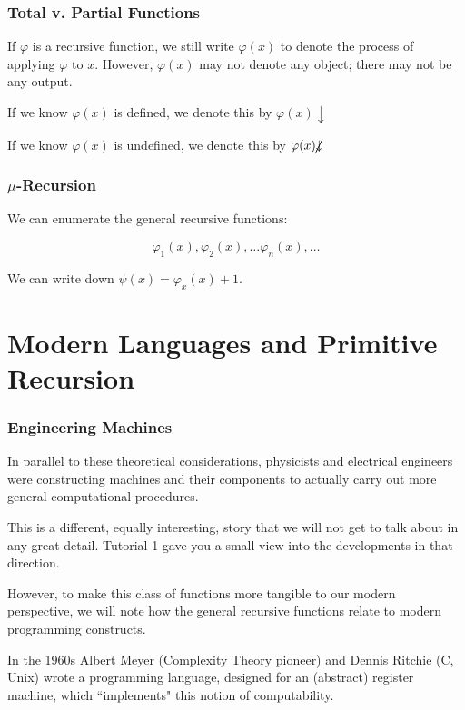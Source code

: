 \documentclass{beamer}
\theoremstyle{indentDefn} \newtheorem{defn}[]{Definition}
\begin{document}
\begin{frame}
	\frametitle{Total v. Partial Functions}

	If $\varphi$ is a recursive function, we still write $\varphi(x)$ to denote the process of applying $\varphi$ to $x$. However, $\varphi(x)$ may not denote any object; there may not be any output.  

	\vspace{0.5cm}

	If we know $\varphi(x)$ is defined, we denote this by $\varphi(x)\downarrow$
	
	\vspace{0.5cm}

	If we know $\varphi(x)$ is undefined, we denote this by $\varphi(x)\cancel{\downarrow}$
\end{frame}

\begin{frame}
	\frametitle{$\mu$-Recursion}

	We can enumerate the general recursive functions:
	
	$$\varphi_{1}(x), \varphi_{2}(x), \dots \varphi_{n}(x), \dots $$ 
		
	We can write down $\psi(x) = \varphi_{x}(x) + 1$. 

	\vspace{5cm}

\end{frame}

\section{Modern Languages and Primitive Recursion}

\begin{frame}
	\frametitle{Engineering Machines}

	In parallel to these theoretical considerations, physicists and electrical engineers were constructing machines and their components to actually carry out more general computational procedures.  

	This is a different, equally interesting, story that we will not get to talk about in any great detail. Tutorial 1 gave you a small view into the developments in that direction. 

	However, to make this class of functions more tangible to our modern perspective, we will note how the general recursive functions relate to modern programming constructs. 

	In the 1960s Albert Meyer (Complexity Theory pioneer) and Dennis Ritchie (C, Unix) wrote a programming language, designed for an (abstract) register machine, which ``implements" this notion of computability.

\end{frame}
\end{document}
